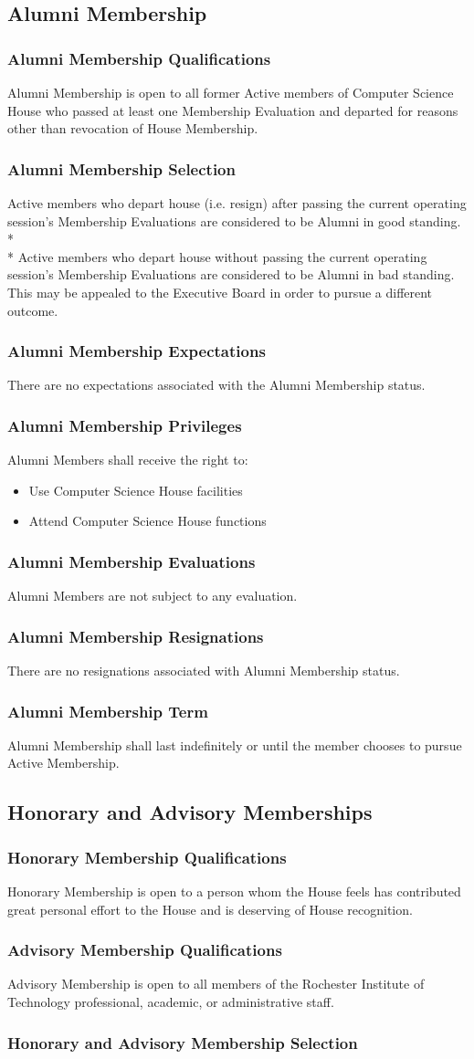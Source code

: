 \documentclass{article}
\newcommand{\asection}[1]{\subsection{#1} \label{#1}}
\newcommand{\asubsection}[1]{\subsubsection{#1} \label{#1}}
\begin{document}
\asection{Alumni Membership}
\asubsection{Alumni Membership Qualifications}
Alumni Membership is open to all former Active members of Computer Science House who passed at least one Membership Evaluation and departed for reasons other than revocation of House Membership.
\asubsection{Alumni Membership Selection}
Active members who depart house (i.e. resign) after passing the current operating session's Membership Evaluations are considered to be Alumni in good standing.
\\*\\*
Active members who depart house without passing the current operating session's Membership Evaluations are considered to be Alumni in bad standing.
This may be appealed to the Executive Board in order to pursue a different outcome.
\asubsection{Alumni Membership Expectations}
There are no expectations associated with the Alumni Membership status.
\asubsection{Alumni Membership Privileges}
Alumni Members shall receive the right to:
\begin{itemize}
	\item Use Computer Science House facilities
	\item Attend Computer Science House functions
\end{itemize}
\asubsection{Alumni Membership Evaluations}
Alumni Members are not subject to any evaluation.
\asubsection{Alumni Membership Resignations}
There are no resignations associated with Alumni Membership status.
\asubsection{Alumni Membership Term}
Alumni Membership shall last indefinitely or until the member chooses to pursue Active Membership.
\asection{Honorary and Advisory Memberships}
\asubsection{Honorary Membership Qualifications}
Honorary Membership is open to a person whom the House feels has contributed great personal effort to the House and is deserving of House recognition.
\asubsection{Advisory Membership Qualifications}
Advisory Membership is open to all members of the Rochester Institute of Technology professional, academic, or administrative staff.
\asubsection{Honorary and Advisory Membership Selection}
\end{document}
